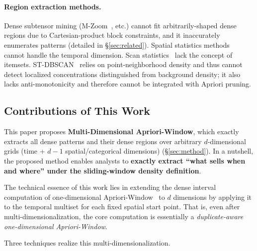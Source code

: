 \paragraph{Region extraction methods.}
Dense subtensor mining (M-Zoom~\cite{shin2016mzoom}, etc.)
cannot fit arbitrarily-shaped dense regions
due to Cartesian-product block constraints,
and it inaccurately enumerates patterns
(detailed in \S\ref{sec:related}).
Spatial statistics methods~\cite{anselin1995lisa,ord1995getis}
cannot handle the temporal dimension.
Scan statistics~\cite{kulldorff1997spatial}
lack the concept of itemsets.
ST-DBSCAN~\cite{birant2007stdbscan} relies on
point-neighborhood density and thus cannot detect
localized concentrations distinguished from background density;
it also lacks anti-monotonicity and therefore
cannot be integrated with Apriori pruning.

\subsection{Contributions of This Work}

This paper proposes
\textbf{Multi-Dimensional Apriori-Window},
which exactly extracts all dense patterns and their dense regions
over arbitrary $d$-dimensional grids
(time + $d{-}1$ spatial/categorical dimensions)
(\S\ref{sec:method}).
In a nutshell, the proposed method enables analysts to
\textbf{exactly extract ``what sells when and where''
under the sliding-window density definition}.

The technical essence of this work lies in extending
the dense interval computation of
one-dimensional Apriori-Window~\cite{aprioriwindow}
to $d$ dimensions by applying it to
the temporal multiset for each fixed spatial start point.
That is, even after multi-dimensionalization,
the core computation is essentially
a \emph{duplicate-aware one-dimensional Apriori-Window}.

Three techniques realize this multi-dimensionalization.

